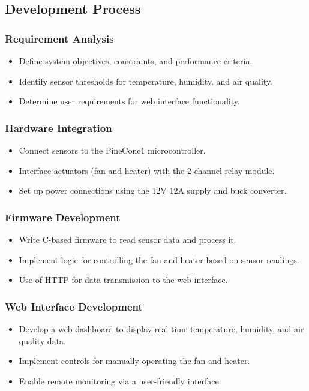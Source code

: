 \documentclass[a4paper]{scrartcl}
\begin{document}
\subsection{Development Process}

\subsubsection{Requirement Analysis}
\begin{itemize}
\item Define system objectives, constraints, and performance criteria.
\item Identify sensor thresholds for temperature, humidity, and air quality.
\item Determine user requirements for web interface functionality.
\end{itemize}

\subsubsection{Hardware Integration}
\begin{itemize}
\item Connect sensors to the PineCone1 microcontroller.
\item Interface actuators (fan and heater) with the 2-channel relay module.
\item Set up power connections using the 12V 12A supply and buck converter.
\end{itemize}

\subsubsection{Firmware Development}
\begin{itemize}
\item Write C-based firmware to read sensor data and process it.
\item Implement logic for controlling the fan and heater based on sensor readings.
\item Use of HTTP for data transmission to the web interface.
\end{itemize}

\subsubsection{Web Interface Development}
\begin{itemize}
\item Develop a web dashboard to display real-time temperature, humidity, and air quality data.
\item Implement controls for manually operating the fan and heater.
\item Enable remote monitoring via a user-friendly interface.
\end{itemize}
\end{document}
